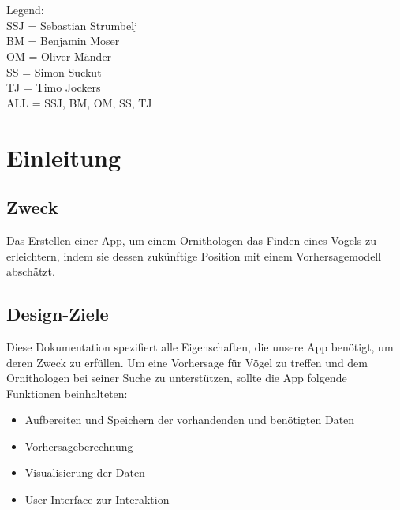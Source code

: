 \documentclass[12pt]{article} %
\begin{document}
{\small

\noindent
\\\\Legend: \\
SSJ = Sebastian Strumbelj \\
BM = Benjamin Moser \\
OM = Oliver Mänder \\
SS = Simon Suckut \\
TJ = Timo Jockers \\
ALL = SSJ, BM, OM, SS, TJ \\
}



\section{Einleitung} %


\subsection{Zweck}
Das Erstellen einer App, um einem Ornithologen das Finden eines Vogels zu erleichtern, indem sie dessen zukünftige Position mit einem Vorhersagemodell abschätzt. 


\subsection{Design-Ziele}

Diese Dokumentation spezifiert alle Eigenschaften, die unsere App benötigt, um deren Zweck zu erfüllen. Um eine Vorhersage für Vögel zu treffen und dem Ornithologen bei seiner Suche zu unterstützen, sollte die App folgende Funktionen beinhalteten: 
\begin{itemize}
	\item Aufbereiten und Speichern der vorhandenden und benötigten Daten
	\item Vorhersageberechnung 
	\item Visualisierung der Daten
	\item User-Interface zur Interaktion 
\end{itemize}



\end{document}

